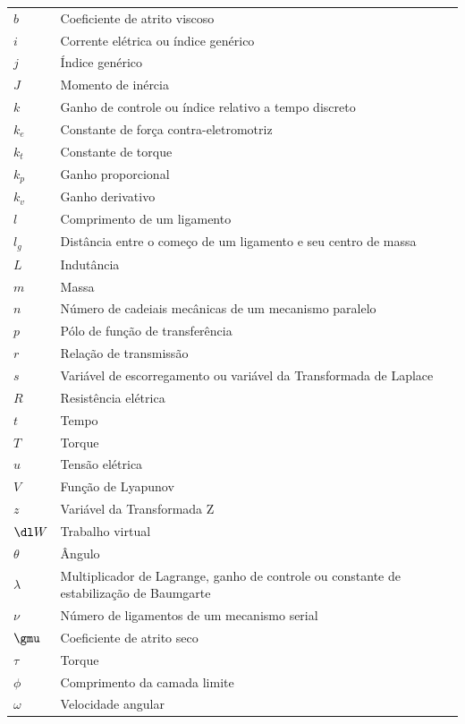 \documentclass[]{politex}
\begin{document}
\begin{longtable}{lp{}}
  $b$ & Coeficiente de atrito viscoso \\
  $i$ & Corrente elétrica ou índice genérico \\
  $j$ & Índice genérico \\
  $J$ & Momento de inércia \\
  $k$ & Ganho de controle ou índice relativo a tempo discreto \\
  $k_e$ & Constante de força contra-eletromotriz \\
  $k_t$ & Constante de torque \\
  $k_p$ & Ganho proporcional \\
  $k_v$ & Ganho derivativo \\
  $l$ & Comprimento de um ligamento \\
  $l_g$ & Distância entre o começo de um ligamento e seu centro de massa \\
  $L$ & Indutância \\
  $m$ & Massa \\
  $n$ & Número de cadeiais mecânicas de um mecanismo paralelo \\
  $p$ & Pólo de função de transferência \\
  $r$ & Relação de transmissão \\
  $s$ & Variável de escorregamento ou variável da Transformada de Laplace \\
  $R$ & Resistência elétrica \\
  $t$ & Tempo \\
  $T$ & Torque \\
  $u$ & Tensão elétrica \\
  $V$ & Função de Lyapunov \\
  $z$ & Variável da Transformada Z \\
  $\dl W$ & Trabalho virtual \\
  $\theta$ & Ângulo \\
  $\lambda$ & Multiplicador de Lagrange, ganho de controle ou constante de estabilização de Baumgarte \\
  $\nu$ & Número de ligamentos de um mecanismo serial \\
  $\gmu$ & Coeficiente de atrito seco \\
  $\tau$ & Torque \\
  $\phi$ & Comprimento da camada limite \\
  $\omega$ & Velocidade angular \\
\end{longtable}
\end{document}
